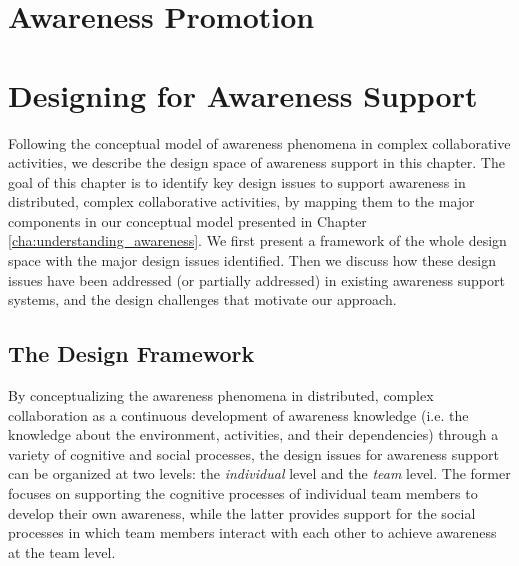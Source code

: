 \graphicspath{{Figures/}}

\chapter{Awareness Promotion} %
\label{cha:awareness_promotion}


\chapter{Designing for Awareness Support} %
\label{cha:designing_for_awareness_support}
Following the conceptual model of awareness phenomena in complex collaborative activities, we describe the design space of awareness support in this chapter. The goal of this chapter is to identify key design issues to support awareness in distributed, complex collaborative activities, by mapping them to the major components in our conceptual model presented in Chapter \ref{cha:understanding_awareness}. We first present a framework of the whole design space with the major design issues identified. Then we discuss how these design issues have been addressed (or partially addressed) in existing awareness support systems, and the design challenges that motivate our approach. 

\section{The Design Framework} %
\label{sec:the_design_space}
By conceptualizing the awareness phenomena in distributed, complex collaboration as a continuous development of awareness knowledge (i.e. the knowledge about the environment, activities, and their dependencies) through a variety of cognitive and social processes, the design issues for awareness support can be organized at two levels: the \emph{individual} level and the \emph{team} level. The former focuses on supporting the cognitive processes of individual team members to develop their own awareness, while the latter provides support for the social processes in which team members interact with each other to achieve awareness at the team level. 


